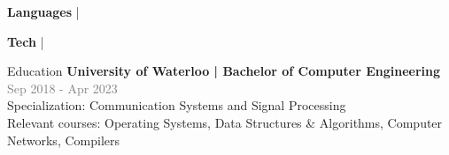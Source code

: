 \documentclass[hidelinks]{resume} %
\begin{document}
\begin{rSubsection}{\textbf{Languages} | }{}{}

\end{rSubsection}
\vspace{-.2cm}
\begin{rSubsection}{\textbf{Tech} | }{}{}

\end{rSubsection}

\vspace{-.20cm}

\begin{rSection}{Education}
\vspace{-.1cm}
{\textbf{University of Waterloo | Bachelor of Computer Engineering}} \hfill {\textcolor{gray}{\small Sep 2018 - Apr 2023}} 
\\ {Specialization: Communication Systems and Signal Processing\\Relevant courses: Operating Systems, Data Structures \& Algorithms, Computer Networks, Compilers}
\vspace{.1cm}
\end{rSection}
\end{document}
